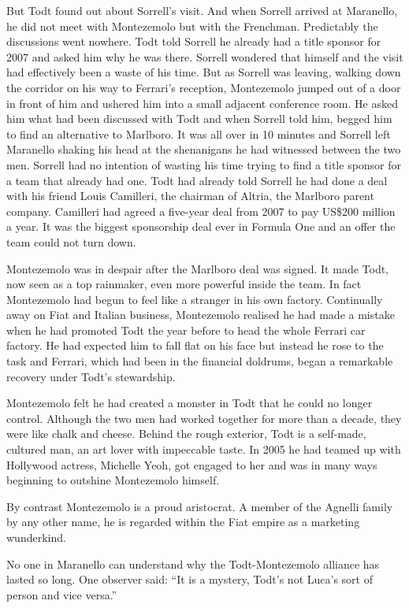 \documentclass{article}
\begin{document}
But Todt found out about Sorrell’s visit. And when Sorrell arrived at Maranello, he did not meet with Montezemolo but with the Frenchman. Predictably the discussions went nowhere. Todt told Sorrell he already had a title sponsor for 2007 and asked him why he was there. Sorrell wondered that himself and the visit had effectively been a waste of his time. But as Sorrell was leaving, walking down the corridor on his way to Ferrari’s reception, Montezemolo jumped out of a door in front of him and ushered him into a small adjacent conference room. He asked him what had been discussed with Todt and when Sorrell told him, begged him to find an alternative to Marlboro. It was all over in 10 minutes and Sorrell left Maranello shaking his head at the shenanigans he had witnessed between the two men. Sorrell had no intention of wasting his time trying to find a title sponsor for a team that already had one. Todt had already told Sorrell he had done a deal with his friend Louis Camilleri, the chairman of Altria, the Marlboro parent company. Camilleri had agreed a five-year deal from 2007 to pay US\$200 million a year. It was the biggest sponsorship deal ever in Formula One and an offer the team could not turn down.

Montezemolo was in despair after the Marlboro deal was signed. It made Todt, now seen as a top rainmaker, even more powerful inside the team. In fact Montezemolo had begun to feel like a stranger in his own factory. Continually away on Fiat and Italian business, Montezemolo realised he had made a mistake when he had promoted Todt the year before to head the whole Ferrari car factory. He had expected him to fall flat on his face but instead he rose to the task and Ferrari, which had been in the financial doldrums, began a remarkable recovery under Todt’s stewardship.

Montezemolo felt he had created a monster in Todt that he could no longer control. Although the two men had worked together for more than a decade, they were like chalk and cheese. Behind the rough exterior, Todt is a self-made, cultured man, an art lover with impeccable taste. In 2005 he had teamed up with Hollywood actress, Michelle Yeoh, got engaged to her and was in many ways beginning to outshine Montezemolo himself.

By contrast Montezemolo is a proud aristocrat. A member of the Agnelli family by any other name, he is regarded within the Fiat empire as a marketing wunderkind.

No one in Maranello can understand why the Todt-Montezemolo alliance has lasted so long. One observer said: “It is a mystery, Todt’s not Luca’s sort of person and vice versa.”
\end{document}
